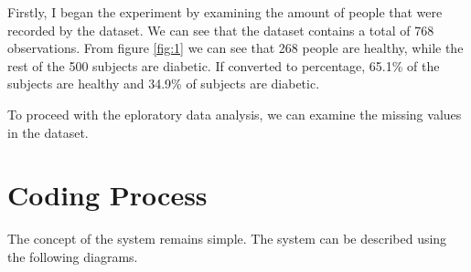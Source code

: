 \documentclass[12pt]{article}
\begin{document}
Firstly, I began the experiment by examining the amount of people that were recorded by the dataset. We can see that the dataset contains a total of 768 observations. From figure \ref{fig:1} we can see that 268 people are healthy, while the rest of the 500 subjects are diabetic. If converted to percentage, 65.1\% of the subjects are healthy and 34.9\% of subjects are diabetic.

To proceed with the eploratory data analysis, we can examine the missing values in the dataset. 












\newpage
\section{Coding Process}
The concept of the system remains simple. The system can be described using the following diagrams.
\end{document}

